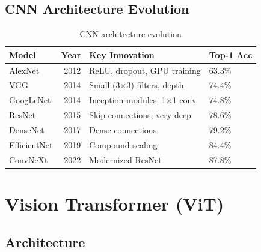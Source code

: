 \subsection{CNN Architecture Evolution}

\begin{table}[H]
\centering
\caption{CNN architecture evolution}
\begin{tabularx}{\textwidth}{lrXl}
\toprule
\textbf{Model} & \textbf{Year} & \textbf{Key Innovation} & \textbf{Top-1 Acc} \\
\midrule
AlexNet & 2012 & ReLU, dropout, GPU training & 63.3\% \\
VGG & 2014 & Small (3×3) filters, depth & 74.4\% \\
GoogLeNet & 2014 & Inception modules, 1×1 conv & 74.8\% \\
ResNet & 2015 & Skip connections, very deep & 78.6\% \\
DenseNet & 2017 & Dense connections & 79.2\% \\
EfficientNet & 2019 & Compound scaling & 84.4\% \\
ConvNeXt & 2022 & Modernized ResNet & 87.8\% \\
\bottomrule
\end{tabularx}
\end{table}

\section{Vision Transformer (ViT)}
\label{sec:vit}

\subsection{Architecture}

